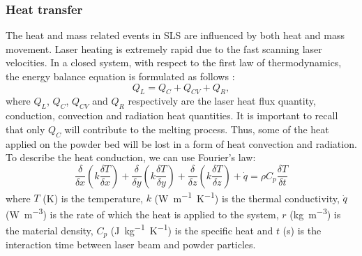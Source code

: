 \subsubsection{Heat transfer}
\label{sssec:heattransfer}
The heat and mass related events in SLS are influenced by both heat and mass movement. Laser heating is extremely rapid due to the fast scanning laser velocities. In a closed system, with respect to the first law of thermodynamics, the energy balance equation is formulated as follows \cite{bouabbou_understanding_2022}:
\begin{equation}
    \label{eq:tutteQ}
    Q_L = Q_C + Q_{CV} + Q_R,
\end{equation}
where $Q_L$, $Q_C$, $Q_{CV}$ and $Q_R$ respectively are the laser heat flux quantity, conduction, convection and radiation heat quantities. It is important to recall that only $Q_C$ will contribute to the melting process. Thus, some of the heat applied on the powder bed will be lost in a form of heat convection and radiation. To describe the heat conduction, we can use Fourier's law:
\begin{equation}
    \label{eq:nonsiecapitouncazzo}
    \frac{\delta}{\delta x}\left(k \frac{\delta T}{\delta x}\right)+\frac{\delta}{\delta y}\left(k \frac{\delta T}{\delta y}\right)+\frac{\delta}{\delta z}\left(k \frac{\delta T}{\delta z}\right)+\dot{q} =\rho C_p \frac{\delta T}{\delta t}
\end{equation}
where $T$ (\unit{\kelvin}) is the temperature, $k$ (\unit{\watt.\metre^{-1}.\kelvin^{-1}}) is the thermal conductivity, $\dot{q}$ (\unit{\watt.\metre^{-3}}) is the rate of which the heat is applied to the system, $r$ (\unit{\kilo\gram.\metre^{-3}}) is the material density, $C_p$ (\unit{\joule. \kilo\gram^{-1}.\kelvin^{-1}}) is the specific heat and $t$ (\unit{\second}) is the interaction time between laser beam and powder particles.

